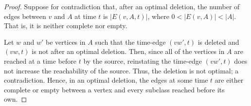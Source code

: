 \documentclass[preprint,12pt]{elsarticle}
\begin{document}
\begin{proof}
    Suppose for contradiction that, after an optimal deletion, the number of edges between $v$ and $A$ at time $t$ is $|E(v,A, t)|$, where $0<|E(v,A)|<|A|$. That is, it is neither complete nor empty.

    Let $w$ and $w'$ be vertices in $A$ such that the time-edge $(vw',t)$ is deleted and $(vw,t)$ is not after an optimal deletion. Then, since all of the vertices in $A$ are reached at a time before $t$ by the source, reinstating the time-edge $(vw',t)$ does not increase the reachability of the source. Thus, the deletion is not optimal; a contradiction. Hence, in an optimal deletion, the edges at some time $t$ are either complete or empty between a vertex and every subclass reached before its own.
\end{proof}
\end{document}

